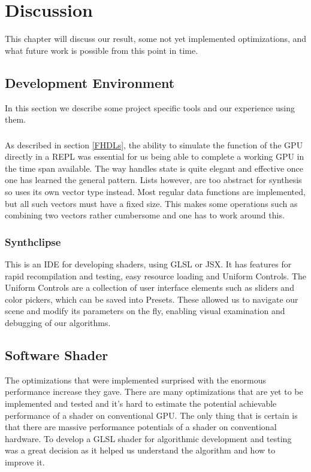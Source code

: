 \chapter{Discussion} 

	This chapter will discuss our result, some not yet implemented optimizations,
	and what future work is possible from this point in time.
	
	\section{Development Environment}
		
		In this section we describe some project specific tools and our experience
		using them.
		
		\subsection{\clash} As described in section \ref{FHDLs}, the ability to
		simulate the function of the GPU directly in a REPL\cite{repl} was
		essential for us being able to complete a working GPU in the time span
		available. The way \clash{} handles state is quite elegant and effective
		once one has learned the general pattern. Lists however, are too abstract
		for synthesis so \clash{} uses its own vector type instead. Most regular
		data functions are implemented, but all such vectors must have a fixed
		size. This makes some operations such as combining two vectors rather
		cumbersome and one has to work around this.
	
		\subsection{Synthclipse}
			This is an IDE for developing shaders, using GLSL or JSX. It has
			features for rapid recompilation and testing, easy resource loading 
			and	Uniform Controls. The Uniform Controls are a collection of user
			interface elements such as sliders and color pickers, which can be
			saved into Presets. These allowed us to navigate our scene and 
			modify its parameters on the fly, enabling visual examination and 
			debugging of our algorithms.		
		
		\section{Software Shader}

			The optimizations that were implemented surprised with the enormous
			performance increase they gave. There are many optimizations that are yet
			to be implemented and tested and it's hard to estimate the potential
			achievable performance of a shader on conventional GPU. The only thing
			that is certain is that there are massive performance potentials of a
			shader on conventional hardware. To develop a GLSL shader for algorithmic
			development and testing was a great decision as it helped us understand
			the algorithm and how to improve it.
			
